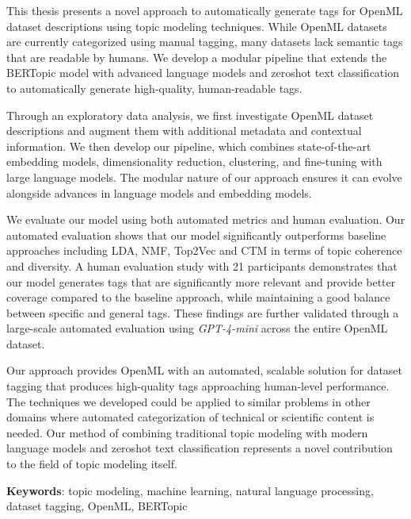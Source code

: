 This thesis presents a novel approach to automatically generate tags for OpenML dataset descriptions using topic modeling techniques. While OpenML datasets are currently categorized using manual tagging, many datasets lack semantic tags that are readable by humans. We develop a modular pipeline that extends the BERTopic model with advanced language models and zeroshot text classification to automatically generate high-quality, human-readable tags.

Through an exploratory data analysis, we first investigate OpenML dataset descriptions and augment them with additional metadata and contextual information. We then develop our pipeline, which combines state-of-the-art embedding models, dimensionality reduction, clustering, and fine-tuning with large language models. The modular nature of our approach ensures it can evolve alongside advances in language models and embedding models.

We evaluate our model using both automated metrics and human evaluation. Our automated evaluation shows that our model significantly outperforms baseline approaches including LDA, NMF, Top2Vec and CTM in terms of topic coherence and diversity. A human evaluation study with 21 participants demonstrates that our model generates tags that are significantly more relevant and provide better coverage compared to the baseline approach, while maintaining a good balance between specific and general tags. These findings are further validated through a large-scale automated evaluation using \textit{GPT-4-mini} across the entire OpenML dataset.

Our approach provides OpenML with an automated, scalable solution for dataset tagging that produces high-quality tags approaching human-level performance. The techniques we developed could be applied to similar problems in other domains where automated categorization of technical or scientific content is needed. Our method of combining traditional topic modeling with modern language models and zeroshot text classification represents a novel contribution to the field of topic modeling itself.

\textbf{Keywords}: topic modeling, machine learning, natural language processing, dataset tagging, OpenML, BERTopic

